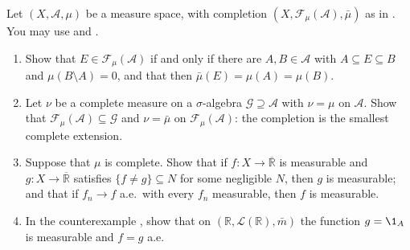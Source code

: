 \begin{exercise}\label{ex:mf-lebesgue-sets}
\medium Let $(X,\mathcal A,\mu)$ be a measure space, with completion
$(X,\mathcal F_\mu(\mathcal A),\bar\mu)$ as in . You may use
 and .
\begin{enumerate}[label=(\alph*)]
  \item Show that $E\in\mathcal F_\mu(\mathcal A)$ if and only if there are $A,B\in\mathcal A$ with
    $A\subseteq E\subseteq B$ and $\mu(B\setminus A)=0$, and that then $\bar\mu(E)=\mu(A)=\mu(B)$.
  \item Let $\nu$ be a complete measure on a $\sigma$-algebra $\mathcal G\supseteq\mathcal A$
    with $\nu=\mu$ on $\mathcal A$. Show that $\mathcal F_\mu(\mathcal A)\subseteq\mathcal G$ and
    $\nu=\bar\mu$ on $\mathcal F_\mu(\mathcal A)$: the completion is the smallest complete
    extension.
  \item Suppose that $\mu$ is complete. Show that if $f:X\to\overline{\mathbb R}$ is measurable
    and $g:X\to\overline{\mathbb R}$ satisfies $\{f\ne g\}\subseteq N$ for some negligible $N$,
    then $g$ is measurable; and that if $f_n\to f$ a.e.\ with every $f_n$ measurable, then $f$
    is measurable.
  \item In the counterexample , show that on
    $(\mathbb R,\mathcal L(\mathbb R),\bar m)$ the function $g=\1_A$ is measurable and
    $f=g$ a.e.
\end{enumerate}
\end{exercise}

